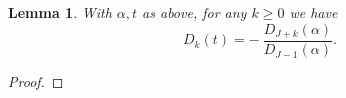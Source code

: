 \documentclass[12pt, reqno]{amsart}
\newtheorem{lemma}[thm]{Lemma}
\theoremstyle{definition}
\theoremstyle{remark}
\numberwithin{equation}{section}
\def\alp{{\alpha}} \def\bfalp{{\boldsymbol \alpha}}
\def \bZ {\mathbb Z}
\begin{document}
	\begin{lemma}
		With $\alpha, t$ as above, for any $k\ge 0$ we have 
		\begin{equation}
			\label{DkRelation}
			D_k(t) = - \: \frac{D_{J+k}(\alpha)}{D_{J-1}(\alpha)}.
		\end{equation}
	\end{lemma}
	\begin{proof}

\end{proof}
\end{document}
